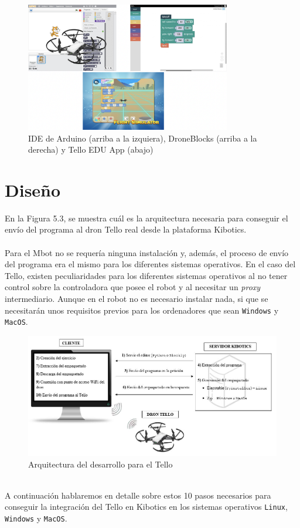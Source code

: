 \documentclass{report}
\begin{document}
\begin{figure}[h!]
  \centering
    \includegraphics[width=0.8\textwidth]{images/software_tello_ide.png}
  \caption{IDE de Arduino (arriba a la izquiera), DroneBlocks (arriba a la derecha) y Tello EDU App (abajo)}
  \label{IDE de Arduino, DroneBlocks y Tello EDU App}
\end{figure}

\section{Diseño}

En la Figura 5.3, se muestra cuál es la arquitectura necesaria para conseguir el envío del programa al dron Tello real desde la plataforma Kibotics.
\\
\\
Para el Mbot no se requería ninguna instalación y, además, el proceso de envío del programa era el mismo para los diferentes sistemas operativos. En el caso del Tello, existen peculiaridades para los diferentes sistemas operativos al no tener control sobre la controladora que posee el robot y al necesitar un \textit{proxy} intermediario. Aunque en el robot no es necesario instalar nada, si que se necesitarán unos requisitos previos para los ordenadores que sean \texttt{Windows} y \texttt{MacOS}.
\\
\begin{figure}[h!]
  \centering
    \includegraphics[width=1\textwidth]{images/infraestructura_tello.png}
  \caption{Arquitectura del desarrollo para el Tello}
  \label{Arquitectura del desarrollo para el Tello}
\end{figure}
\\
A continuación hablaremos en detalle sobre estos 10 pasos necesarios para conseguir la integración del Tello en Kibotics en los sistemas operativos \texttt{Linux}, \texttt{Windows} y \texttt{MacOS}.
\end{document}
